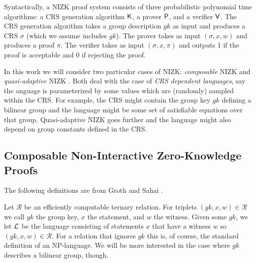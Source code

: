Syntactically, a NIZK proof system consists of three probabilistic polynomial time algorithms: a CRS
generation algorithm $\mathsf{K}$, a prover $\mathsf{P}$, and a verifier $\mathsf{V}$.
The CRS generation algorithm takes a group description $gk$ as input and produces a CRS $\sigma$ (which we assume includes $gk$). The prover takes as input $(\sigma, x, w)$ and produces a proof $\pi$. The verifier takes as input $(\sigma, x, \pi)$ and outputs 1 if the proof is acceptable and 0 if rejecting the proof.

In this work we will consider two particular cases of NIZK: \emph{composable} NIZK \cite{EC:GroSah08} and  \emph{quasi-adaptive} NIZK \cite{AC:JutRoy13}. Both deal with the case of \emph{CRS dependent languages}, say the anguage is parameterized by some values which are (randomly) sampled within the CRS. For example, the CRS might contain the group key $gk$ defining a bilinear group and the language might be some set of satisfiable equations over that group. Quasi-adaptive NIZK goes further and the language might also depend on group constants defined in the CRS.
 
\subsection{Composable Non-Interactive Zero-Knowledge Proofs}
The following definitions are from Groth and Sahai \cite{SIAMJC:GroSah12}.

\begin{definition} Let $\mathcal{R}$ be an efficiently computable ternary relation.
For triplets $(gk, x, w)\in \mathcal{R}$ we call $gk$ the group key, $x$ the statement, and $w$ the witness.
Given some $gk$, we let $\mathcal{L}$ be the language consisting of statements $x$ that have a
witness $w$ so $(gk, x, w) \in \mathcal{R}$. For a relation that ignores $gk$ this is, of course, the
standard definition of an NP-language. We will be more interested in the case where
$gk$ describes a bilinear group, though.
\end{definition}

